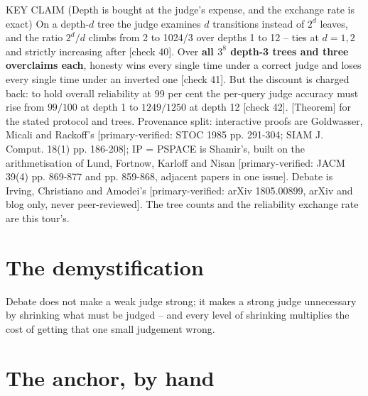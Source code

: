 \begin{whybox}{KEY CLAIM (Depth is bought at the judge's expense, and the exchange rate is exact)}
On a depth-$d$ tree the judge examines $d$ transitions instead of $2^d$ leaves, and the ratio $2^d/d$ climbs from 2 to 1024/3 over depths 1 to 12 -- ties at $d=1,2$ and strictly increasing after [check 40]. Over \textbf{all $3^8$ depth-3 trees and three overclaims each}, honesty wins every single time under a correct judge and loses every single time under an inverted one [check 41]. But the discount is charged back: to hold overall reliability at 99 per cent the per-query judge accuracy must rise from $99/100$ at depth 1 to $1249/1250$ at depth 12 [check 42]. [Theorem] for the stated protocol and trees.
Provenance split: interactive proofs are Goldwasser, Micali and Rackoff's [primary-verified: STOC 1985 pp. 291-304; SIAM J. Comput. 18(1) pp. 186-208]; IP = PSPACE is Shamir's, built on the arithmetisation of Lund, Fortnow, Karloff and Nisan [primary-verified: JACM 39(4) pp. 869-877 and pp. 859-868, adjacent papers in one issue]. Debate is Irving, Christiano and Amodei's [primary-verified: arXiv 1805.00899, arXiv and blog only, never peer-reviewed]. The tree counts and the reliability exchange rate are this tour's.
\end{whybox}

\section*{The demystification}

\begin{whyboxnt}
Debate does not make a weak judge strong; it makes a strong judge unnecessary by shrinking what must be judged -- and every level of shrinking multiplies the cost of getting that one small judgement wrong.
\end{whyboxnt}

\section*{The anchor, by hand}

